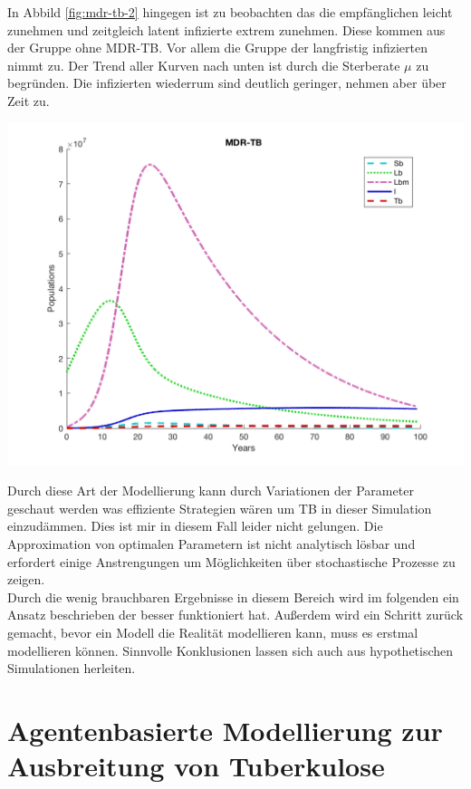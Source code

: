 \documentclass[paper=a4, fontsize=11pt, ngerman, abstract=on]{scrartcl}
\numberwithin{equation}{section} %
\numberwithin{figure}{section} %
\numberwithin{table}{section} %
\begin{document}
\begin{minipage}{0.4\linewidth}
  In Abbild \ref{fig:mdr-tb-2} hingegen ist zu beobachten das die empfänglichen leicht zunehmen und zeitgleich latent infizierte extrem zunehmen. Diese kommen aus der Gruppe ohne MDR-TB. Vor allem die Gruppe der langfristig infizierten nimmt zu. Der Trend aller Kurven nach unten ist durch die Sterberate $\mu$ zu begründen. Die infizierten wiederrum sind deutlich geringer, nehmen aber über Zeit zu.
\end{minipage}\hfill
\begin{minipage}{0.6\linewidth}
  \includegraphics[width=\linewidth]{images/mdr_tb_2}
  \label{fig:mdr-tb-2}
\end{minipage}

Durch diese Art der Modellierung kann durch Variationen der Parameter geschaut werden was effiziente Strategien wären um TB in dieser Simulation einzudämmen. Dies ist mir in diesem Fall leider nicht gelungen. Die Approximation von optimalen Parametern ist nicht analytisch lösbar und erfordert einige Anstrengungen um Möglichkeiten über stochastische Prozesse zu zeigen. \\

Durch die wenig brauchbaren Ergebnisse in diesem Bereich wird im folgenden ein Ansatz beschrieben der besser funktioniert hat. Außerdem wird ein Schritt zurück gemacht, bevor ein Modell die Realität modellieren kann, muss es erstmal modellieren können. Sinnvolle Konklusionen lassen sich auch aus hypothetischen Simulationen herleiten.

\section{Agentenbasierte Modellierung zur Ausbreitung von Tuberkulose}
\end{document}
